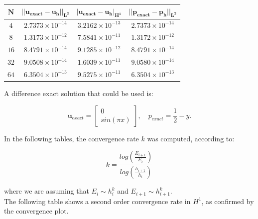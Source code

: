 \documentclass[11pt,a4paper,titlepage]{report}
\begin{document}
\begin{center}
\begin{tabular}{| c | c | c | c |}
\hline
$\mathbf{N}$ & $\mathbf{|| u_{exact} - u_h ||_{L^2}}$ & $ \mathbf{ | u_{exact} - u_h |_{H^1}}$ & $  \mathbf{ || p_{exact} - p_h ||_{L^2}}$ \\
\hline
$ 4 $ & $2.7373 \times 10^{-14}$ & $3.2162 \times 10^{-13}$ &  $ 2.7373 \times 10^{-14}$ \\
\hline
$ 8$ & $1.3173  \times 10^{-12}$ & $7.5841 \times 10^{-11}$ &  $ 1.3172  \times 10^{-12}$ \\
\hline
$ 16 $ & $ 8.4791 \times 10^{-14}$ & $9.1285 \times 10^{-12}$ & $ 8.4791 \times 10^{-14}$ \\
\hline
$ 32$ & $9.0508 \times 10^{-14}$ & $1.6039 \times 10^{-11}$ &  $ 9.0580 \times 10^{-14}$ \\
\hline
$ 64$ & $6.3504 \times 10^{-13}$ & $9.5275 \times 10^{-11}$ &  $ 6.3504 \times 10^{-13}$ \\
\hline
\end{tabular}
\end{center}

\vspace{1cm}

A difference exact solution that could be used is:

\[
\mathbf{u}_{exact} = \left[ \begin{array}{c} 0 \\ sin(\pi x) \end{array} \right], \quad
p_{exact} = \frac{1}{2}-y.
\]

In the following tables, the convergence rate $k$ was computed, according to:

\[
k = \frac{log(\frac{E_{i+1}}{E_i})}{log(\frac{h_{i+1}}{h_i})}
\]

where we are assuming that $E_i \sim h^k_i$ and $E_{i+1} \sim h^k_{i+1}$. \\
The following table shows a second order convergence rate in $H^1$, as confirmed by the convergence plot.
\end{document}
